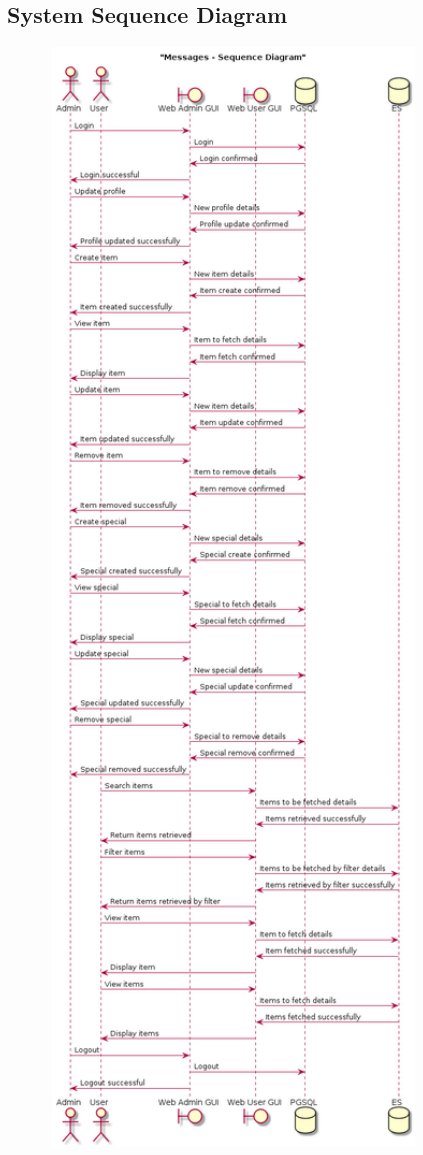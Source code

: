\documentclass[a4paper,10pt]{article}
\begin{document}
\subsection{System Sequence Diagram}
\includegraphics[width=12cm]{System_Sequence_Diagram.png}
\end{document}
